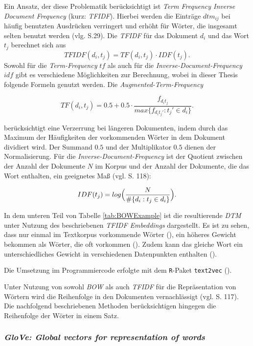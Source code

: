 \documentclass[a4paper,11pt]{article}
\begin{document}
Ein Ansatz, der diese Problematik berücksichtigt ist \textit{Term Frequency Inverse Document Frequency} (kurz: \textit{TFIDF}). Hierbei werden die Einträge $dtm_{ij}$ bei häufig benutzten Ausdrücken verringert und erhöht für Wörter, die insgesamt selten benutzt werden (vlg. \cite{textMiningR} S.29). Die \textit{TFIDF} für das Dokument $d_i$ und das Wort $t_j$ berechnet sich aus 
\[TFIDF(d_i, t_j) = TF(d_i,t_j) \cdot IDF(t_j) . \]
Sowohl für die \textit{Term-Frequency} $tf$ als auch für die \textit{Inverse-Document-Frequency} $idf$ gibt es verschiedene Möglichkeiten zur Berechnung, wobei in dieser Thesis folgende Formeln genutzt werden.
Die \textit{Augmented-Term-Frequency}

\[TF(d_i,t_j) = 0.5 +  0.5 \cdot \frac{f_{d_i t_j}}{max \{ f_{d_i t_j'}: t_j' \in d_i \}} .\]

berücksichtigt eine Verzerrung bei längeren Dokumenten, indem durch das Maximum der Häufigkeiten der vorkommenden Wörter in dem Dokument dividiert wird. Der Summand $0.5$ und der Multiplikator $0.5$ dienen der Normalisierung. Für die \textit{Inverse-Document-Frequency} ist der Quotient zwischen der Anzahl der Dokumente $N$ im Korpus und der Anzahl der Dokumente, die das Wort enthalten, ein geeignetes Maß (vgl. \cite{deepEssentials} S. 118):

\[IDF(t_j) = log \Bigl( \frac{N}{\# \{d_i: t_j \in d_i \}} \Bigr) .\]

In dem unteren Teil von Tabelle \ref{tab:BOWExample} ist die resultierende \textit{DTM} unter Nutzung des beschriebenen \textit{TFIDF Embeddings} dargestellt. Es ist zu sehen, dass nur einmal im Textkorpus vorkommende Wörter (), ein höheres Gewicht bekommen als Wörter, die oft vorkommen (). Zudem kann das gleiche Wort ein unterschiedliches Gewicht in verschiedenen Datenpunkten enthalten ().

Die Umsetzung im Programmiercode erfolgte mit dem \texttt{R}-Paket \texttt{text2vec} (\cite{text2vec}).

Unter Nutzung von sowohl \textit{BOW} als auch \textit{TFIDF} für die Repräsentation von Wörtern wird die Reihenfolge in den Dokumenten vernachlässigt (vgl. \cite{deepEssentials} S. 117). 
Die nachfolgend beschriebenen Methoden berücksichtigen hingegen die Reihenfolge der Wörter in einem Satz.


\subsubsection{\textit{GloVe: Global vectors for representation of words}} \label{Kap:Glove}
\end{document}
